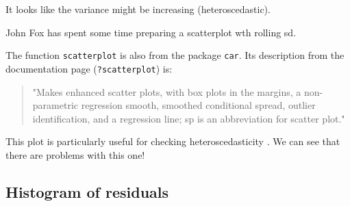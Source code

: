 \documentclass[titlepage]{book}\usepackage{knitr}
\begin{document}
It looks like the variance might be increasing (heteroscedastic). 

John Fox has spent some time preparing a scatterplot wth rolling sd.


\begin{knitrout}
\color{fgcolor}
\end{knitrout}



The function \texttt{scatterplot} is also from the package \texttt{car}. Its description from the documentation page (\texttt{?scatterplot}) is: 
\begin{quote}
"Makes enhanced scatter plots, with box plots in the margins, a non-parametric regression smooth, smoothed conditional spread, outlier identification, and a regression line; sp is an abbreviation for scatter plot."
\end{quote}
This plot is particularly useful for checking heteroscedasticity .  We can see that there are problems with this one!

\subsection{Histogram of residuals}

\begin{knitrout}
\color{fgcolor}\begin{kframe}
\begin{alltt}
 \hlkwb{<-}  \hlstd{(} \hlopt{+}\hlstd{(} \hlstd{=} \hlstd{,}  \hlstd{=} \hlstd{,}  \hlstd{=}  \hlstd{)}
\end{alltt}
\end{kframe}
\end{knitrout}
\end{document}
